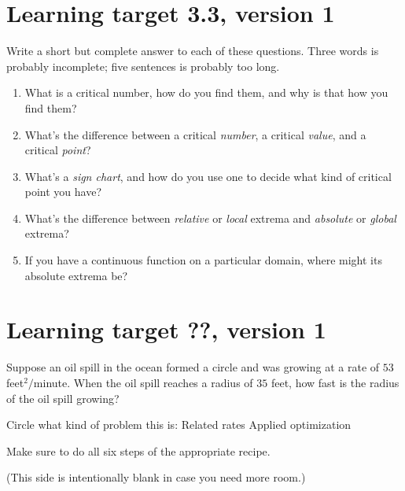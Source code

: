 \pagebreak

\section{Learning target 3.3, version 1}

Write a short but complete answer to each of these questions. Three words is probably incomplete; five sentences is probably too long.
\begin{enumerate}[leftmargin=15pt]
    \item What is a critical number, how do you find them, and why is that how you find them?
    \vfill
    \item What's the difference between a critical \textit{number}, a critical \textit{value}, and a critical \textit{point}?
    \vfill
    \item What's a \textit{sign chart}, and how do you use one to decide what kind of critical point you have?
    \vfill
    \item What's the difference between \textit{relative} or \textit{local} extrema and \textit{absolute} or \textit{global} extrema?
    \vfill
    \item If you have a continuous function on a particular domain, where might its absolute extrema be?
    \vfill
\end{enumerate}

\pagebreak

\section{Learning target ??, version 1} %

Suppose an oil spill in the ocean formed a circle and was growing at a rate of \(53\) feet\(^2/\)minute. When the oil spill reaches a radius of \(35\) feet, how fast is the radius of the oil spill growing? 

\vspace{1em}

Circle what kind of problem this is: \qquad Related rates \qquad Applied optimization

\vspace{1em}

Make sure to do all six steps of the appropriate recipe.

\pagebreak
(This side is intentionally blank in case you need more room.)
\pagebreak


